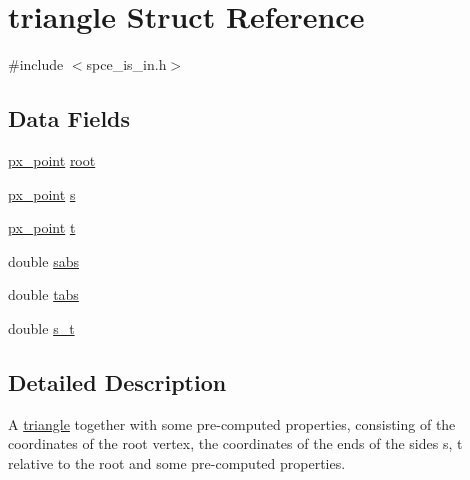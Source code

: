 \hypertarget{structtriangle}{
\section{triangle Struct Reference}
\label{structtriangle}
}


{\ttfamily \#include $<$spce\_\-is\_\-in.h$>$}\subsection*{Data Fields}
\begin{DoxyCompactItemize}
\item 
\hyperlink{structpx__point}{px\_\-point} \hyperlink{structtriangle_a0c5a2697ad4499cee584e11dc94ef48e}{root}
\item 
\hyperlink{structpx__point}{px\_\-point} \hyperlink{structtriangle_adb4c4c0952d90abc37c9007239c9749e}{s}
\item 
\hyperlink{structpx__point}{px\_\-point} \hyperlink{structtriangle_adaa3bc970f5fb00d8e7f5fa0cff15c9c}{t}
\item 
double \hyperlink{structtriangle_a623fb1a6ba02daa89ef261704904e35e}{sabs}
\item 
double \hyperlink{structtriangle_a9847876d54795168060857aeeaec7cca}{tabs}
\item 
double \hyperlink{structtriangle_a85745d45cfb20177d5f41d9deaf29d74}{s\_\-t}
\end{DoxyCompactItemize}


\subsection{Detailed Description}
A \hyperlink{structtriangle}{triangle} together with some pre-\/computed properties, consisting of the coordinates of the root vertex, the coordinates of the ends of the sides s, t relative to the root and some pre-\/computed properties. 

